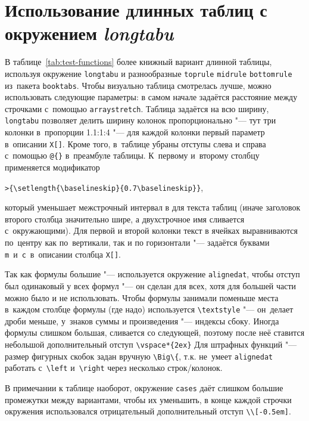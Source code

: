 \section{Использование длинных таблиц с окружением \textit{longtabu}}\label{app:B2a}

В таблице~\ref{tab:test-functions} более книжный вариант
длинной таблицы, используя окружение \verb!longtabu! и разнообразные
\verb!toprule! \verb!midrule! \verb!bottomrule! из~пакета
\verb!booktabs!. Чтобы визуально таблица смотрелась лучше, можно
использовать следующие параметры: в самом начале задаётся расстояние
между строчками с~помощью \verb!arraystretch!. Таблица задаётся на
всю ширину, \verb!longtabu! позволяет делить ширину колонок
пропорционально "--- тут три колонки в~пропорции 1.1:1:4 "--- для каждой
колонки первый параметр в~описании \verb!X[]!. Кроме того, в~таблице
убраны отступы слева и справа с~помощью \verb!@{}!
в~преамбуле таблицы. К~первому и~второму столбцу применяется
модификатор

\verb!>{\setlength{\baselineskip}{0.7\baselineskip}}!,

\noindent который уменьшает межстрочный интервал в для текста таблиц (иначе
заголовок второго столбца значительно шире, а двухстрочное имя
сливается с~окружающими). Для первой и второй колонки текст в ячейках
выравниваются по~центру как по~вертикали, так и по горизонтали "---
задаётся буквами \verb!m!~и~\verb!c!~в~описании столбца \verb!X[]!.

Так как формулы большие "--- используется окружение \verb!alignedat!,
чтобы отступ был одинаковый у всех формул "--- он сделан для всех, хотя
для большей части можно было и не использовать.  Чтобы формулы
занимали поменьше места в~каждом столбце формулы (где надо)
используется \verb!\textstyle! "--- он~делает дроби меньше, у~знаков
суммы и произведения "--- индексы сбоку. Иногда формулы слишком большая,
сливается со следующей, поэтому после неё ставится небольшой
дополнительный отступ \verb!\vspace*{2ex}!  Для штрафных функций "---
размер фигурных скобок задан вручную \verb!\Big\{!, т.\:к. не~умеет
\verb!alignedat! работать с~\verb!\left! и~\verb!\right! через
несколько строк/колонок.

В примечании к таблице наоборот, окружение \verb!cases! даёт слишком
большие промежутки между вариантами, чтобы их уменьшить, в конце
каждой строчки окружения использовался отрицательный дополнительный
отступ \verb!\\[-0.5em]!.

